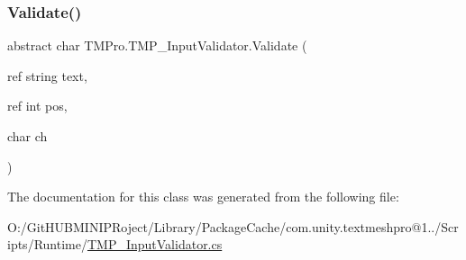 \subsubsection{\texorpdfstring{Validate()}{Validate()}}
{\footnotesize\ttfamily abstract char T\+M\+Pro.\+T\+M\+P\+\_\+\+Input\+Validator.\+Validate (\begin{DoxyParamCaption}\item[{ref string}]{text,  }\item[{ref int}]{pos,  }\item[{char}]{ch }\end{DoxyParamCaption})\hspace{0.3cm}{\ttfamily [pure virtual]}}



The documentation for this class was generated from the following file\+:\begin{DoxyCompactItemize}
\item 
O\+:/\+Git\+H\+U\+B\+M\+I\+N\+I\+P\+Roject/\+Library/\+Package\+Cache/com.\+unity.\+textmeshpro@1../\+Scripts/\+Runtime/\mbox{\hyperlink{_t_m_p___input_validator_8cs}{T\+M\+P\+\_\+\+Input\+Validator.\+cs}}\end{DoxyCompactItemize}
